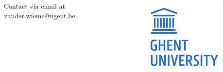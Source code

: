 \documentclass[25pt, a0paper, portrait]{tikzposter}
\begin{document}
\begin{columns}
     {
    }

     {
        \vspace{-1cm}
        
    }



    \block{}{

    }

     {
        Contact via email at xander.wieme@ugent.be. \\
        \begin{figure}
            \vspace{-4cm}
            \begin{tikzfigure}[]
                \includegraphics[height=4cm]{figures/ugent_logo}
            \end{tikzfigure}
        \end{figure}
    }


\end{columns}
\end{document}
